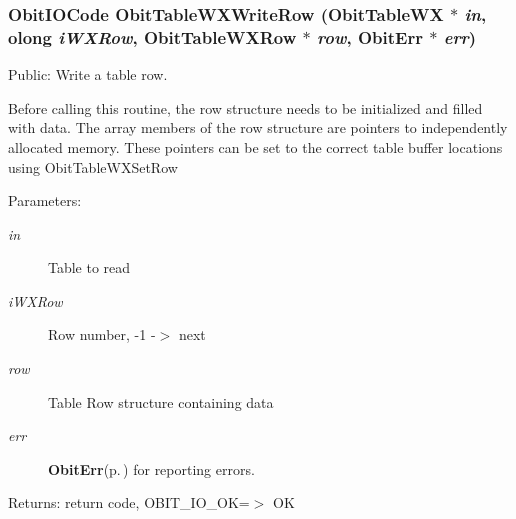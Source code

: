 \subsubsection{\setlength{\rightskip}{0pt plus 5cm}Obit\-IOCode Obit\-Table\-WXWrite\-Row ({\bf Obit\-Table\-WX} $\ast$ {\em in}, {\bf olong} {\em i\-WXRow}, {\bf Obit\-Table\-WXRow} $\ast$ {\em row}, {\bf Obit\-Err} $\ast$ {\em err})}\label{ObitTableWX_8c_a24}


Public: Write a table row. 

Before calling this routine, the row structure needs to be initialized and filled with data. The array members of the row structure are pointers to independently allocated memory. These pointers can be set to the correct table buffer locations using Obit\-Table\-WXSet\-Row \begin{Desc}
\item[Parameters:]
\begin{description}
\item[{\em in}]Table to read \item[{\em i\-WXRow}]Row number, -1 -$>$ next \item[{\em row}]Table Row structure containing data \item[{\em err}]{\bf Obit\-Err}{\rm (p.\,\pageref{structObitErr})} for reporting errors. \end{description}
\end{Desc}
\begin{Desc}
\item[Returns:]return code, OBIT\_\-IO\_\-OK=$>$ OK \end{Desc}
